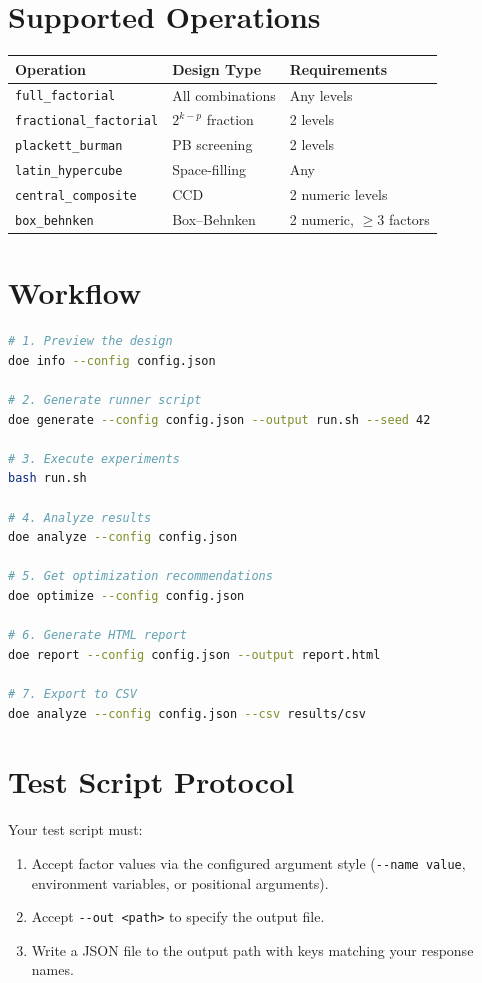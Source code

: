 \documentclass[11pt]{book}
\begin{document}
\section{Supported Operations}

\begin{center}
\begin{tabular}{lll}
\toprule
Operation & Design Type & Requirements \\
\midrule
\texttt{full\_factorial} & All combinations & Any levels \\
\texttt{fractional\_factorial} & $2^{k-p}$ fraction & 2 levels \\
\texttt{plackett\_burman} & PB screening & 2 levels \\
\texttt{latin\_hypercube} & Space-filling & Any \\
\texttt{central\_composite} & CCD & 2 numeric levels \\
\texttt{box\_behnken} & Box--Behnken & 2 numeric, $\geq$3 factors \\
\bottomrule
\end{tabular}
\end{center}

\section{Workflow}

\begin{lstlisting}[language=bash]
# 1. Preview the design
doe info --config config.json

# 2. Generate runner script
doe generate --config config.json --output run.sh --seed 42

# 3. Execute experiments
bash run.sh

# 4. Analyze results
doe analyze --config config.json

# 5. Get optimization recommendations
doe optimize --config config.json

# 6. Generate HTML report
doe report --config config.json --output report.html

# 7. Export to CSV
doe analyze --config config.json --csv results/csv
\end{lstlisting}

\section{Test Script Protocol}

Your test script must:
\begin{enumerate}[nosep]
\item Accept factor values via the configured argument style
      (\texttt{-{}-name value}, environment variables, or positional arguments).
\item Accept \texttt{-{}-out <path>} to specify the output file.
\item Write a JSON file to the output path with keys matching your response names.
\end{enumerate}
\end{document}
